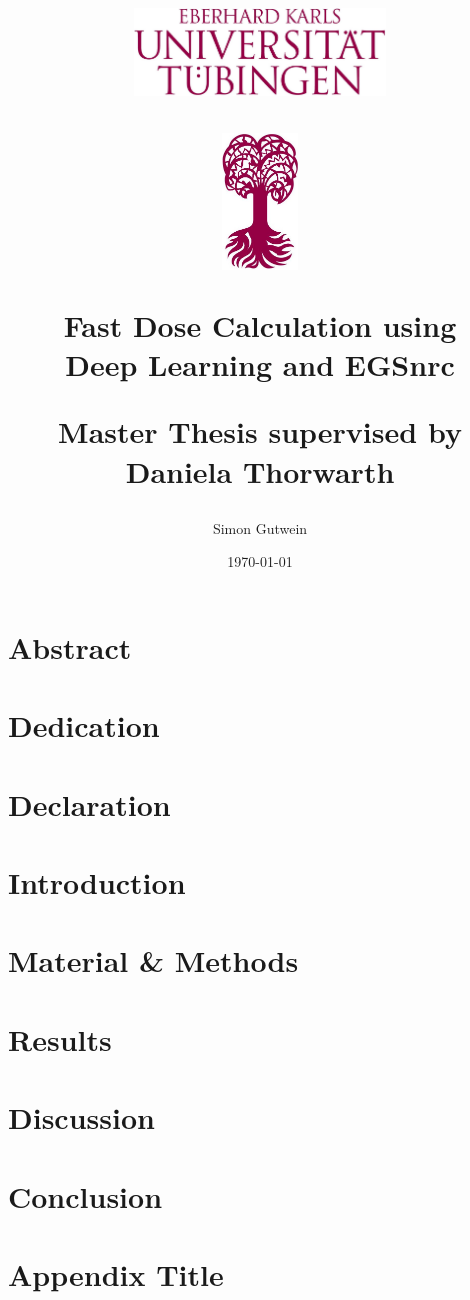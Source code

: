 \documentclass[12pt]{report}
\title{
	\centering
	\includegraphics[width=0.5\textwidth]{logo4}\par\vspace{1cm}
	\includegraphics[width=0.15\textwidth]{logo3}\par\vspace{1cm}
	{\huge\bfseries Fast Dose Calculation using \\ Deep Learning and EGSnrc\par}
	\vspace{1cm}
	{\fontsize{20.74}{0}\selectfont Master Thesis}\vspace{3cm}
	\vfill
	{\fontsize{17}{18}\selectfont supervised by \fontsize{17}{18}\selectfont\\ Daniela Thorwarth}
	\vfill
}
\author{Simon Gutwein}
\date{\today}
\begin{document}
\maketitle

\chapter{Abstract}


\chapter{Dedication}


\chapter{Declaration}


\tableofcontents
\listoffigures
\listoftables

\chapter{Introduction}


\chapter{Material \& Methods}


\chapter{Results}


\chapter{Discussion}


\chapter{Conclusion}


\printbibliography

\appendix
\chapter{Appendix Title}

\end{document}
